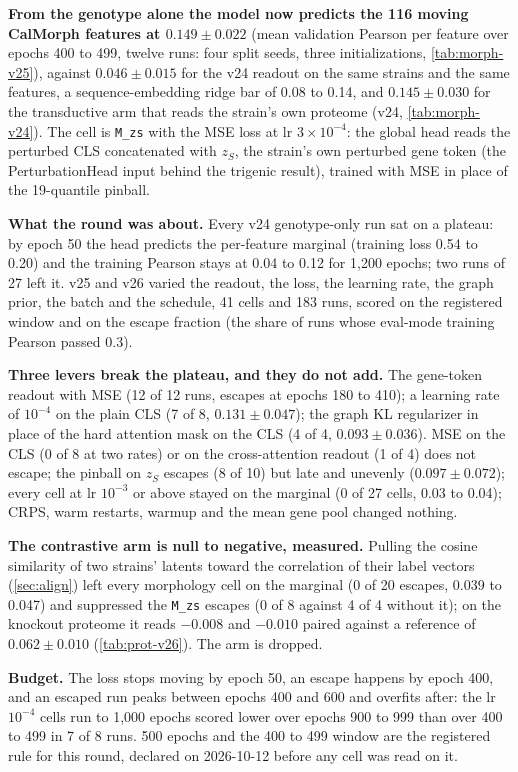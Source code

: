 \begin{keybox}
\textbf{From the genotype alone the model now predicts the 116 moving CalMorph features at
$0.149 \pm 0.022$} (mean validation Pearson per feature over epochs 400 to 499, twelve runs:
four split seeds, three initializations, \cref{tab:morph-v25}), against $0.046 \pm 0.015$ for the
v24 readout on the same strains and the same features, a sequence-embedding ridge bar of 0.08
to 0.14, and $0.145 \pm 0.030$ for the transductive arm that reads the strain's own proteome
(v24, \cref{tab:morph-v24}). The cell is \texttt{M\_zs} with the MSE loss at lr $3\times10^{-4}$: the
global head reads the perturbed CLS concatenated with $z_S$, the strain's own perturbed gene
token (the PerturbationHead input behind the trigenic result), trained with MSE in place of
the 19-quantile pinball.

\textbf{What the round was about.} Every v24 genotype-only run sat on a plateau: by epoch 50
the head predicts the per-feature marginal (training loss 0.54 to 0.20) and the training
Pearson stays at 0.04 to 0.12 for 1{,}200 epochs; two runs of 27 left it. v25 and v26 varied
the readout, the loss, the learning rate, the graph prior, the batch and the schedule, 41
cells and 183 runs, scored on the registered window and on the escape fraction (the share of
runs whose eval-mode training Pearson passed 0.3).

\textbf{Three levers break the plateau, and they do not add.} The gene-token readout with
MSE (12 of 12 runs, escapes at epochs 180 to 410); a learning rate of $10^{-4}$ on the plain CLS
(7 of 8, $0.131 \pm 0.047$); the graph KL regularizer in place of the hard attention mask on
the CLS (4 of 4, $0.093 \pm 0.036$). MSE on the CLS (0 of 8 at two rates) or on the
cross-attention readout (1 of 4) does not escape; the pinball on $z_S$ escapes (8 of 10) but
late and unevenly ($0.097 \pm 0.072$); every cell at lr $10^{-3}$ or above stayed on the
marginal (0 of 27 cells, 0.03 to 0.04); CRPS, warm restarts, warmup and the mean gene pool
changed nothing.

\textbf{The contrastive arm is null to negative, measured.} Pulling the cosine similarity of
two strains' latents toward the correlation of their label vectors (\cref{sec:align}) left
every morphology cell on the marginal (0 of 20 escapes, 0.039 to 0.047) and suppressed the
\texttt{M\_zs} escapes (0 of 8 against 4 of 4 without it); on the knockout proteome it reads
$-0.008$ and $-0.010$ paired against a reference of $0.062 \pm 0.010$ (\cref{tab:prot-v26}).
The arm is dropped.

\textbf{Budget.} The loss stops moving by epoch 50, an escape happens by epoch 400, and an
escaped run peaks between epochs 400 and 600 and overfits after: the lr $10^{-4}$ cells run to
1{,}000 epochs scored lower over epochs 900 to 999 than over 400 to 499 in 7 of 8 runs. 500
epochs and the 400 to 499 window are the registered rule for this round, declared on
2026-10-12 before any cell was read on it.
\end{keybox}

